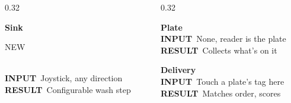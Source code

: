 \documentclass[aspectratio=169,t]{beamer}
\begin{document}
{\begin{frame}[plain]
\begin{columns}[t,totalwidth=\linewidth]
\begin{column}{0.32\textwidth}
\begin{whitecard}[height=2.2cm,left=2.2mm,right=2.2mm]
{\bfseries\fontsize{9.5}{11}\selectfont Sink} \hfill {\scriptsize\color{white}\colorbox{tealBright}{\strut NEW}}\\[1mm]
{\color{teal}\bfseries\fontsize{6.5}{8}\selectfont INPUT}\ {\color{bodyText}\fontsize{7.5}{9.5}\selectfont Joystick, any direction}\\[0.6mm]
{\color{rustText}\bfseries\fontsize{6.5}{8}\selectfont RESULT}\ {\color{bodyText}\fontsize{7.5}{9.5}\selectfont Configurable wash step}
\end{whitecard}
\end{column}
\begin{column}{0.32\textwidth}
\begin{whitecard}[height=2.2cm,left=2.2mm,right=2.2mm]
{\bfseries\fontsize{9.5}{11}\selectfont Plate}\\[1mm]
{\color{teal}\bfseries\fontsize{6.5}{8}\selectfont INPUT}\ {\color{bodyText}\fontsize{7.5}{9.5}\selectfont None, reader is the plate}\\[0.6mm]
{\color{rustText}\bfseries\fontsize{6.5}{8}\selectfont RESULT}\ {\color{bodyText}\fontsize{7.5}{9.5}\selectfont Collects what's on it}
\end{whitecard}
\vspace{1.8mm}
\begin{whitecard}[height=2.2cm,left=2.2mm,right=2.2mm]
{\bfseries\fontsize{9.5}{11}\selectfont Delivery}\\[1mm]
{\color{teal}\bfseries\fontsize{6.5}{8}\selectfont INPUT}\ {\color{bodyText}\fontsize{7.5}{9.5}\selectfont Touch a plate's tag here}\\[0.6mm]
{\color{rustText}\bfseries\fontsize{6.5}{8}\selectfont RESULT}\ {\color{bodyText}\fontsize{7.5}{9.5}\selectfont Matches order, scores}
\end{whitecard}
\end{column}
\end{columns}
\end{frame}
}
\end{document}
